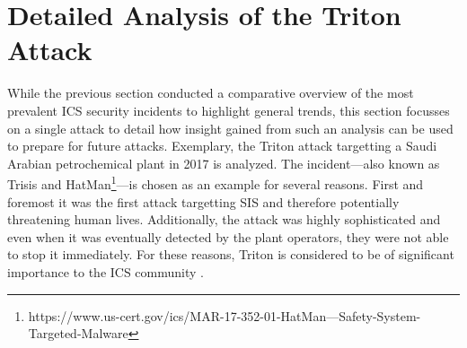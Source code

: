 \documentclass[runningheads]{llncs}
\begin{document}
\section{Detailed Analysis of the Triton Attack}
While the previous section conducted a comparative overview of the most prevalent ICS security incidents to highlight general trends, this section focusses on a single attack to detail how insight gained from such an analysis can be used to prepare for future attacks.
Exemplary, the Triton attack targetting a Saudi Arabian petrochemical plant in 2017 is analyzed.
The incident---also known as Trisis \cite{dragos.17} and HatMan\footnote{https://www.us-cert.gov/ics/MAR-17-352-01-HatMan—Safety-System-Targeted-Malware}---is chosen as an example for several reasons.
First and foremost it was the first attack targetting SIS and therefore potentially threatening human lives.
Additionally, the attack was highly sophisticated and even when it was eventually detected by the plant operators, they were not able to stop it immediately.
For these reasons, Triton is considered to be of significant importance to the ICS community \cite{dragos.17}.
\end{document}

